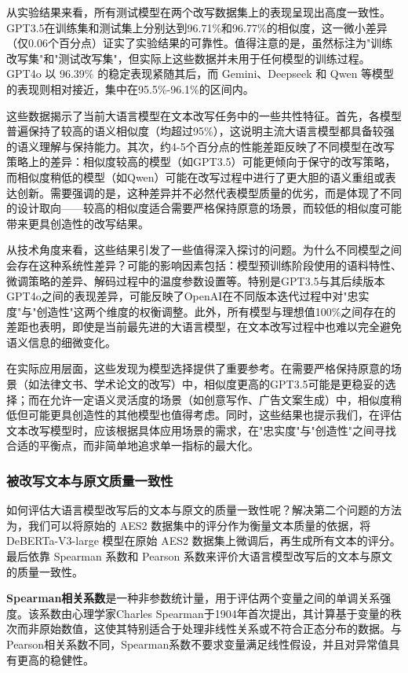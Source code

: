 从实验结果来看，所有测试模型在两个改写数据集上的表现呈现出高度一致性。GPT3.5在训练集和测试集上分别达到96.71\%和96.77\%的相似度，这一微小差异（仅0.06个百分点）证实了实验结果的可靠性。值得注意的是，虽然标注为"训练改写集"和"测试改写集"，但实际上这些数据并未用于任何模型的训练过程。GPT4o 以 96.39\% 的稳定表现紧随其后，而 Gemini、Deepseek 和 Qwen 等模型的表现则相对接近，集中在95.5\%-96.1\%的区间内。

这些数据揭示了当前大语言模型在文本改写任务中的一些共性特征。首先，各模型普遍保持了较高的语义相似度（均超过95\%），这说明主流大语言模型都具备较强的语义理解与保持能力。其次，约4-5个百分点的性能差距反映了不同模型在改写策略上的差异：相似度较高的模型（如GPT3.5）可能更倾向于保守的改写策略，而相似度稍低的模型（如Qwen）可能在改写过程中进行了更大胆的语义重组或表达创新。需要强调的是，这种差异并不必然代表模型质量的优劣，而是体现了不同的设计取向——较高的相似度适合需要严格保持原意的场景，而较低的相似度可能带来更具创造性的改写结果。

从技术角度来看，这些结果引发了一些值得深入探讨的问题。为什么不同模型之间会存在这种系统性差异？可能的影响因素包括：模型预训练阶段使用的语料特性、微调策略的差异、解码过程中的温度参数设置等。特别是GPT3.5与其后续版本GPT4o之间的表现差异，可能反映了OpenAI在不同版本迭代过程中对"忠实度"与"创造性"这两个维度的权衡调整。此外，所有模型与理想值100\%之间存在的差距也表明，即使是当前最先进的大语言模型，在文本改写过程中也难以完全避免语义信息的细微变化。

在实际应用层面，这些发现为模型选择提供了重要参考。在需要严格保持原意的场景（如法律文书、学术论文的改写）中，相似度更高的GPT3.5可能是更稳妥的选择；而在允许一定语义灵活度的场景（如创意写作、广告文案生成）中，相似度稍低但可能更具创造性的其他模型也值得考虑。同时，这些结果也提示我们，在评估文本改写模型时，应该根据具体应用场景的需求，在"忠实度"与"创造性"之间寻找合适的平衡点，而非简单地追求单一指标的最大化。

\subsubsection{被改写文本与原文质量一致性}

如何评估大语言模型改写后的文本与原文的质量一致性呢？解决第二个问题的方法为，我们可以将原始的 AES2 数据集中的评分作为衡量文本质量的依据，将 DeBERTa-V3-large 模型在原始 AES2 数据集上微调后，再生成所有文本的评分。最后依靠 Spearman 系数和 Pearson 系数来评价大语言模型改写后的文本与原文的质量一致性。

\textbf{Spearman相关系数}是一种非参数统计量，用于评估两个变量之间的单调关系强度。该系数由心理学家Charles Spearman于1904年首次提出\cite{Spearman}，其计算基于变量的秩次而非原始数值，这使其特别适合于处理非线性关系或不符合正态分布的数据。与Pearson相关系数不同，Spearman系数不要求变量满足线性假设，并且对异常值具有更高的稳健性。

